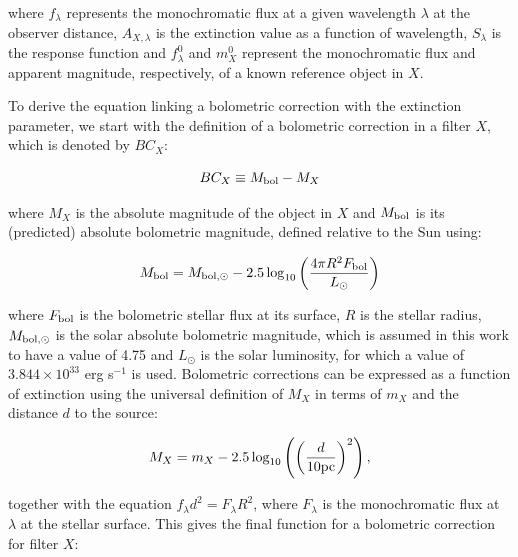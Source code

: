 \documentclass[a4paper, 11pt, oneside]{LJMU_Astro_Thesis}  %
\begin{document}
where $f_{\lambda}$ represents the monochromatic flux at a given wavelength $\lambda$ at the observer distance, $A_{X,\lambda}$ is the extinction value as a function of wavelength, $S_{\lambda}$ is the response function and $f_{\lambda}^{0}$ and $m_{X}^{0}$ represent the monochromatic flux and apparent magnitude, respectively, of a known reference object in $X$.


To derive the equation linking a bolometric correction with the extinction parameter, we start with the definition of a bolometric correction in a filter $X$, which is denoted by $BC_{X}$:

\begin{equation}
BC_{X} \equiv M_{\textnormal{bol}} - M_{X}
\label{BC_def}
\end{equation}

where $M_{X}$ is the absolute magnitude of the object in $X$ and $M_{\textnormal{bol}}$ is its (predicted) absolute bolometric magnitude, defined relative to the Sun using:

\begin{equation}
M_{\textnormal{bol}} = M_{\textnormal{bol},\odot} - 2.5 \log_{10} \left( \frac{4\pi R^{2}F_{\textnormal{bol}}}{L_{\odot}} \right)
\label{mbol_sun}
\end{equation}

where  $F_{\textnormal{bol}}$ is the bolometric stellar flux at its surface, $R$ is the stellar radius, $M_{\textnormal{bol},\odot}$ is the solar absolute bolometric magnitude, which is assumed in this work to have a value of 4.75 and $L_{\odot}$ is the solar luminosity, for which a value of $3.844 \times 10^{33}$ erg s$^{-1}$ is used. Bolometric corrections can be expressed as a function of extinction using the universal definition of $M_{X}$ in terms of $m_{X}$ and the distance $d$ to the source:

\begin{equation}
M_{X} = m_{X} - 2.5 \log_{10}\left( \left( \frac{d}{10 \textnormal{pc}} \right)^{2} \right),
\label{abs_mag_def}
\end{equation}

together with the equation $f_{\lambda}d^{2}=F_{\lambda}R^{2}$, where $F_{\lambda}$ is the monochromatic flux at $\lambda$ at the stellar surface. This gives the final function for a bolometric correction for filter $X$:
\end{document}
